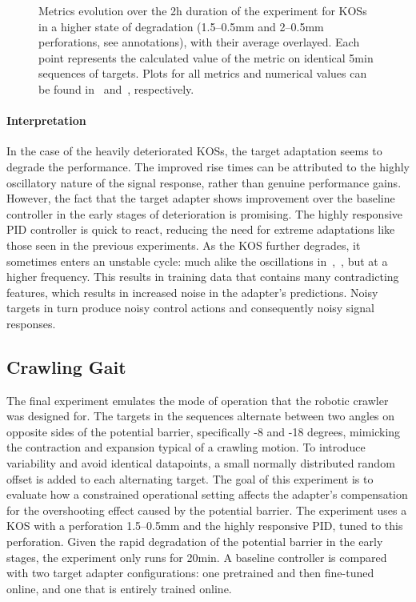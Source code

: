 \begin{figure}
    \centering
    
    \vspace*{-2em}
    \caption{Metrics evolution over the 2\si{\hour} duration of the experiment for KOSs in a higher state of degradation (1.5--0.5\si{\mm} and 2--0.5\si{\mm} perforations, see annotations), with their average overlayed. Each point represents the calculated value of the metric on identical 5\si{\minute} sequences of targets. Plots for all metrics and numerical values can be found in~ and~, respectively.}
    \label{fig:150--50-200--50-metrics}
\end{figure}

\paragraph*{Interpretation}
In the case of the heavily deteriorated KOSs, the target adaptation seems to degrade the performance.
The improved rise times can be attributed to the highly oscillatory nature of the signal response, rather than genuine performance gains.
However, the fact that the target adapter shows improvement over the baseline controller in the early stages of deterioration is promising.
The highly responsive PID controller is quick to react, reducing the need for extreme adaptations like those seen in the previous experiments.
As the KOS further degrades, it sometimes enters an unstable cycle: much alike the oscillations in~,~, but at a higher frequency.
This results in training data that contains many contradicting features, which results in increased noise in the adapter's predictions.
Noisy targets in turn produce noisy control actions and consequently noisy signal responses.

\subsection{Crawling Gait}\label{subsec:crawling-gait}
The final experiment emulates the mode of operation that the robotic crawler was designed for.
The targets in the sequences alternate between two angles on opposite sides of the potential barrier, specifically -8 and -18 degrees, mimicking the contraction and expansion typical of a crawling motion.
To introduce variability and avoid identical datapoints, a small normally distributed random offset is added to each alternating target.
The goal of this experiment is to evaluate how a constrained operational setting affects the adapter's compensation for the overshooting effect caused by the potential barrier.
The experiment uses a KOS with a perforation 1.5--0.5\si{\mm} and the highly responsive PID, tuned to this perforation.
Given the rapid degradation of the potential barrier in the early stages, the experiment only runs for 20\si{\minute}.
A baseline controller is compared with two target adapter configurations: one pretrained and then fine-tuned online,
and one that is entirely trained online.


